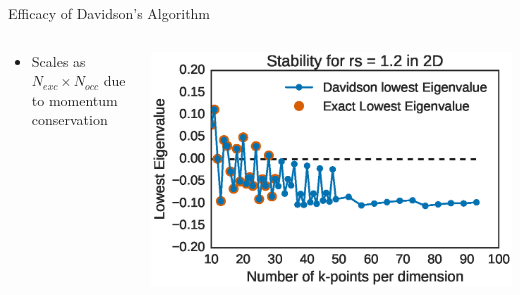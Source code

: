 \documentclass[10pt]{beamer}
\begin{document}
{{{{{{{{{{{{{\begin{frame}{Efficacy of Davidson's Algorithm}
	\begin{columns}[c] %
		\begin{column}{.4\textwidth}
			\begin{itemize}
				\item {Scales as $N_{exc} \times  N_{occ}$ due to momentum conservation}
			\end{itemize}				
		\end{column}
		\hfill
		\begin{column}{0.6\textwidth}
		    \begin{overprint}
			    \includegraphics[width=\linewidth]{../images/dav_vs_exact.eps}

			\end{overprint}
		\end{column}	
	\end{columns}
\end{frame}


}}}}}}}}}}}}}
\end{document}
